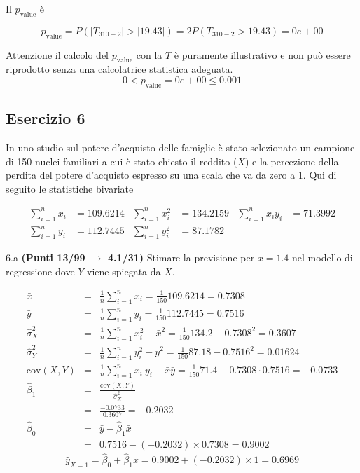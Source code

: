 \documentclass[
  11pt,
]{book}
\theoremstyle{mytheoremstyle}
\theoremstyle{mydefstyle}
\newenvironment{sol}
  {
  \begin{tcolorbox}[enhanced,breakable,arc=0.1mm,boxrule=1pt,colback=white,colframe=iblue,
  title=\bf \fontfamily{lmss}\selectfont \hspace{.5 cm} Soluzione,drop fuzzy shadow]

}{
\end{tcolorbox}
  }
\begin{document}
\begin{sol}
Il \(p_{\text{value}}\) è

\[ p_{\text{value}} = P(|T_{310-2}|>|19.43|)=2P(T_{310-2}>19.43)=0e+00 \]

Attenzione il calcolo del \(p_\text{value}\) con la \(T\) è puramente illustrativo e non può essere riprodotto senza una calcolatrice statistica adeguata.\[
 0 < p_\text{value}= 0e+00 \leq 0.001 
\]

\end{sol}

\subsection{Esercizio 6}\label{esercizio-6-10}

In uno studio sul potere d'acquisto delle famiglie è stato selezionato un campione di 150 nuclei familiari
a cui è stato chiesto il reddito (\(X\)) e la percezione della perdita del potere d'acquisto espresso su una scala che va da zero a 1.
Qui di seguito le statistiche bivariate

\begin{align*}
  \sum_{i=1}^n x_i &= 109.6214 &\sum_{i=1}^n x_i^2 &= 134.2159 &\sum_{i=1}^n x_i y_i &= 71.3992\\
  \sum_{i=1}^n y_i &= 112.7445 & \sum_{i=1}^n y_i^2 &= 87.1782 &
\end{align*}

6.a \textbf{(Punti 13/99 \(\rightarrow\) 4.1/31)} Stimare la previsione per \(x=1.4\) nel modello di regressione dove \(Y\) viene spiegata da \(X\).

\begin{sol}
\begin{eqnarray*}
           \bar x &=&\frac 1 n\sum_{i=1}^n x_i = \frac {1}{ 150 }  109.6214 =  0.7308 \\
           \bar y &=&\frac 1 n\sum_{i=1}^n y_i = \frac {1}{ 150 }  112.7445 =  0.7516 \\
           \hat\sigma_X^2&=&\frac 1 n\sum_{i=1}^n x_i^2-\bar x^2=\frac {1}{ 150 }  134.2  - 0.7308 ^2= 0.3607 \\
           \hat\sigma_Y^2&=&\frac 1 n\sum_{i=1}^n y_i^2-\bar y^2=\frac {1}{ 150 }  87.18  - 0.7516 ^2= 0.01624 \\
           \text{cov}(X,Y)&=&\frac 1 n\sum_{i=1}^n x_i~y_i-\bar x\bar y=\frac {1}{ 150 }  71.4 - 0.7308 \cdot 0.7516 = -0.0733 \\
           \hat\beta_1 &=& \frac{\text{cov}(X,Y)}{\hat\sigma_X^2} \\
                    &=& \frac{ -0.0733 }{ 0.3607 }  =  -0.2032 \\
           \hat\beta_0 &=& \bar y - \hat\beta_1 \bar x\\
                    &=&  0.7516 - (-0.2032) \times  0.7308 = 0.9002 
         \end{eqnarray*}\[\hat y_{X= 1 }=\hat\beta_0+\hat\beta_1 x= 0.9002 + (-0.2032) \times 1 = 0.6969 \]

\end{sol}
\end{document}
